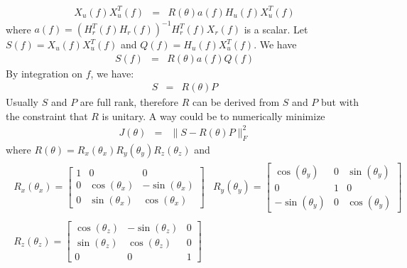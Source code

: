 \documentclass[a4paper, 12pt]{report}
\begin{document}
\begin{eqnarray*}
X_{u}(f)X_{u}^{T}(f) &=&R(\theta)a(f)H_{u}(f) X_{u}^{T}(f)
\end{eqnarray*}
where $a(f)=(H_{r}^{T}(f)H_{r}(f))^{-1}H_{r}^{T}(f)X_{r}(f)$ is a scalar. Let $S(f)=X_{u}(f)X_{u}^{T}(f)$ and $Q(f)=H_{u}(f) X_{u}^{T}(f)$. We have
\begin{eqnarray*}
S(f)&=&R(\theta)a(f)Q(f)
\end{eqnarray*}
By integration on $f$, we have:
\begin{eqnarray*}
S&=&R(\theta) P
\end{eqnarray*}
Usually $S$ and $P$ are full rank, therefore $R$ can be derived from $S$ and $P$ but with the constraint that $R$ is unitary.
A way could be to numerically minimize 
\begin{eqnarray*}
J(\theta) &=& \| S - R(\theta)P\|_{F}^{2}
\end{eqnarray*}
where $R(\theta)=R_{x}(\theta_{x})R_{y}(\theta_{y})R_{z}(\theta_{z})$ and
\begin{eqnarray*}
\begin{array}{ccc}
R_{x}(\theta_{x})=
\begin{bmatrix}
1&0&0\\
0 &\cos(\theta_{x})&-\sin(\theta_{x})\\
0&\sin(\theta_{x})&\cos(\theta_{x})
\end{bmatrix}
&
%
R_{y}(\theta_{y})=
\begin{bmatrix}
\cos(\theta_{y})&0&\sin(\theta_{y})\\
0&1&0\\
-\sin(\theta_{y})&0&\cos(\theta_{y})
\end{bmatrix}
\\ \\
%
R_{z}(\theta_{z})=
\begin{bmatrix}
\cos(\theta_{z})&-\sin(\theta_{z})&0\\
\sin(\theta_{z})&\cos(\theta_{z})&0\\
0&0&1
\end{bmatrix}
\end{array}
\end{eqnarray*}
\end{document}
